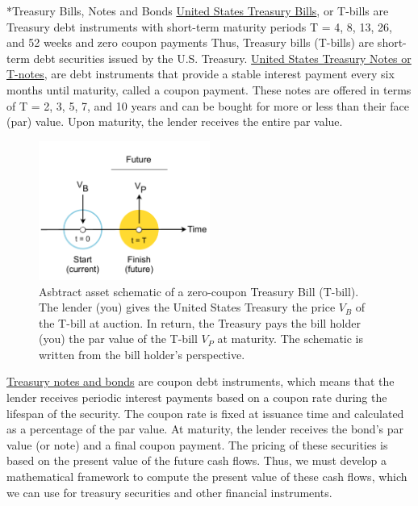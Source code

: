 \documentclass[11pt]{article}
\makeatletter
\theoremstyle{definition}
\renewcommand\subsection{\@startsection
	{subsection}{2}{0mm}
	{-0.05in}
	{-0.5\baselineskip}
	{\normalfont\normalsize\bfseries}}
\makeatother
\begin{document}
\subsection*{Treasury Bills, Notes and Bonds}\label{sec:treasury-bills}
\href{https://treasurydirect.gov/marketable-securities/treasury-bills/}{United States Treasury Bills}, or T-bills are Treasury debt instruments with short-term maturity periods T = 4, 8, 13, 26, and 52 weeks and zero coupon payments
Thus, Treasury bills (T-bills) are short-term debt securities issued by the U.S. Treasury. \href{https://treasurydirect.gov/marketable-securities/treasury-notes/}{United States Treasury Notes or T-notes}, 
are debt instruments that provide a stable interest payment every six months until maturity, called a coupon payment.
These notes are offered in terms of T = 2, 3, 5, 7, and 10 years and can be bought for more or less than their face (par) value. 
Upon maturity, the lender receives the entire par value. 
\begin{figure}[h]
    \centering
    \includegraphics[width=0.5\textwidth]{./figs/Fig-Bill-Asset-Timeline-Schematic.pdf}
    \caption{Asbtract asset schematic of a zero-coupon Treasury Bill (T-bill). The lender (you) gives the United States Treasury 
    the price $V_{B}$ of the T-bill at auction. In return, the Treasury pays the bill holder (you) the par value of the T-bill $V_{P}$ at maturity. 
	The schematic is written from the bill holder's perspective.}\label{fig:govt-bill-schematic}
\end{figure}
\href{https://treasurydirect.gov/marketable-securities/treasury-bonds/}{Treasury notes and bonds} are coupon debt instruments, which means that the lender receives periodic interest payments based on a coupon rate during the lifespan of the security. 
The coupon rate is fixed at issuance time and calculated as a percentage of the par value. 
At maturity, the lender receives the bond's par value (or note) and a final coupon payment. The pricing of these securities is based on the present value of the future cash flows. 
Thus, we must develop a mathematical framework to compute the present value of these cash flows, which we can use for 
treasury securities and other financial instruments.
\end{document}
